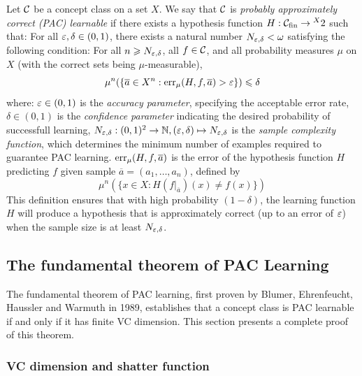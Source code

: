 \begin{definition}
\label{def:PAClearnability}
\begin{outline}
\0 Let $\mathcal{C}$ be a concept class on a set $X$. We say that $\mathcal{C}$ is \emph{probably approximately correct (PAC) learnable} if there exists a hypothesis function $H:\mathcal{C}_{\text{fin}} \rightarrow \prescript{X}{}{2}$ such that:
    \1 For all $\varepsilon, \delta \in (0,1)$, there exists a natural number $N_{\varepsilon,\delta} < \omega$ satisfying the following condition:
    \1 For all $n \geqslant N_{\varepsilon,\delta}$, all $f \in \mathcal{C}$, and all probability measures $\mu$ on $X$ (with the correct sets being $\mu$-measurable),
$$\mu^n(\{\overline{a} \in X^n : \operatorname{err}_\mu(H,f,\overline{a}) > \varepsilon\}) \leqslant \delta$$
    where:
        \2 $\varepsilon\in(0,1)$ is the \emph{accuracy parameter}, specifying the acceptable error rate,
        \2 $\delta\in(0,1)$ is the \emph{confidence parameter} indicating the desired probability of successfull learning,
        \2 $N_{\varepsilon,\delta}: (0,1)^2\rightarrow \mathbb{N}, (\varepsilon,\delta) \mapsto N_{\varepsilon,\delta}$ is the \emph{sample complexity function}, which determines the minimum number of examples required to guarantee PAC learning. 
        \2 $\operatorname{err}_\mu(H,f,\overline{a})$ is the error of the hypothesis function $H$ predicting $f$ given sample $\overline{a}=(a_1,\ldots,a_n)$, defined by 
        $$\mu^n(\{x\in X : H(f|_{\overline{a}})(x)\neq f(x)\})$$
\0 This definition ensures that with high probability $(1-\delta)$, the learning function $H$ will produce a hypothesis that is approximately correct (up to an error of $\varepsilon$) when the sample size is at least $N_{\varepsilon,\delta}$.
\end{outline}
\end{definition}

\subsection{The fundamental theorem of PAC Learning}
\label{section:fdmThmofPAC}

The fundamental theorem of PAC learning, first proven by Blumer, Ehrenfeucht, Haussler and Warmuth in 1989, establishes that a concept class is PAC learnable if and only if it has finite VC dimension. This section presents a complete proof of this theorem.

\subsubsection{VC dimension and shatter function}
\label{subsection:1}


